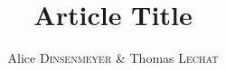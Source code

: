\documentclass[twoside]{article}
\title{\vspace{-15mm}\fontsize{24pt}{10pt}\selectfont\textbf{Article Title}} %
\author{
\large
{Alice \textsc{Dinsenmeyer} \& Thomas \textsc{Lechat}}\\[2mm] %
\vspace{-5mm}
}
\date{}
\begin{document}
\maketitle %

\thispagestyle{fancy} %


\begin{abstract}

\noindent 

\end{abstract}

\end{document}
